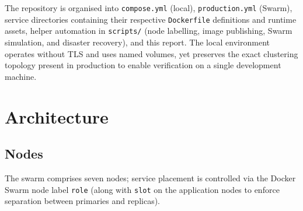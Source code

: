 \documentclass[11pt,a4paper]{article}
\begin{document}
The repository is organised into \texttt{compose.yml} (local), \texttt{production.yml} (Swarm),
service directories containing their respective \texttt{Dockerfile} definitions and runtime
assets, helper automation in \texttt{scripts/} (node labelling, image publishing, Swarm simulation,
and disaster recovery), and this report. The local environment operates without TLS and uses
named volumes, yet preserves the exact clustering topology present in production to enable verification on a single development machine.

\section{Architecture}

\subsection{Nodes}

The swarm comprises seven nodes; service placement is controlled via the Docker Swarm node label \texttt{role}
(along with \texttt{slot} on the application nodes to enforce separation between primaries and replicas).
\end{document}
